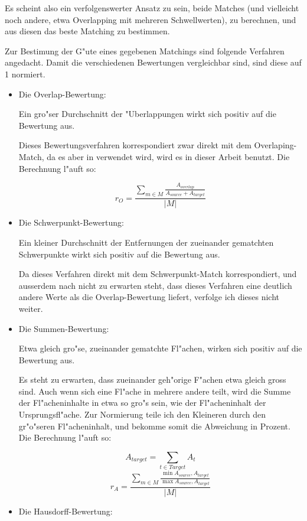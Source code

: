 Es scheint also ein verfolgenswerter Ansatz zu sein, beide Matches (und vielleicht noch andere, etwa Overlapping mit mehreren Schwellwerten), zu berechnen, und aus diesen das beste Matching zu bestimmen. 

Zur Bestimung der G"ute eines gegebenen Matchings sind folgende Verfahren angedacht. Damit die verschiedenen Bewertungen vergleichbar sind, sind diese auf 1 normiert.
\begin{itemize}
\item Die Overlap-Bewertung: 

Ein gro"ser Durchschnitt der "Uberlappungen wirkt sich positiv auf die Bewertung aus.

Dieses Bewertungsverfahren korrespondiert zwar direkt mit dem Overlaping-Match, da es aber in \cite{AFRW} verwendet wird, wird es in dieser Arbeit benutzt. Die Berechnung l"auft so:

$$r_O=\frac{\sum_{m\in M} \frac{A_{overlap}}{A_{source}+A_{target}}}{|M|}$$

\item Die Schwerpunkt-Bewertung:

Ein kleiner Durchschnitt der Entfernungen der zueinander gematchten Schwerpunkte wirkt sich positiv auf die Bewertung aus.

Da dieses Verfahren direkt mit dem Schwerpunkt-Match korrespondiert, und ausserdem nach \cite{AFRW} nicht zu erwarten steht, dass dieses Verfahren eine deutlich andere Werte als die Overlap-Bewertung liefert, verfolge ich dieses nicht weiter.

\item Die Summen-Bewertung:


Etwa gleich gro"se, zueinander gematchte Fl"achen, wirken sich positiv auf die Bewertung aus.

Es steht zu erwarten, dass zueinander geh"orige F"achen etwa gleich gross sind. Auch wenn sich eine Fl"ache in mehrere andere teilt, wird die Summe der Fl"acheninhalte in etwa so gro"s sein, wie der Fl"acheninhalt der Ursprungsfl"ache. Zur Normierung teile ich den Kleineren durch den gr"o"seren Fl"acheninhalt, und bekomme somit die Abweichung in Prozent. Die Berechnung l"auft so:

$$A_{target}=\sum_{t\in Target}A_t$$
$$r_A=\frac {\sum_{m\in M}\frac{\min{A_{source},A_{target}}}{\max{A_{source},A_{target}}}}{|M|}$$

\item Die Hausdorff-Bewertung:


\end{itemize}
